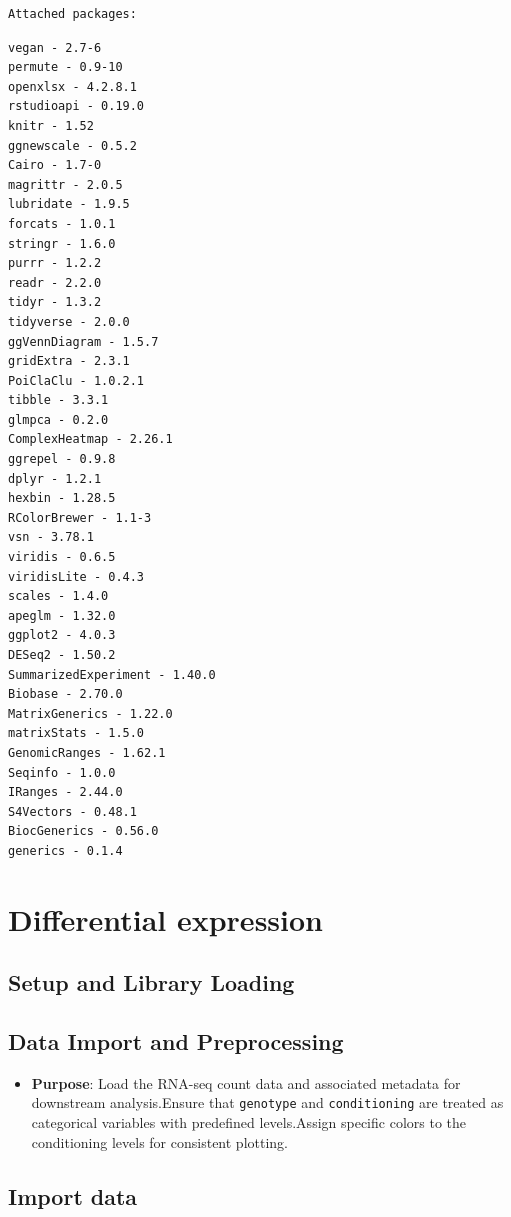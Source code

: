 \documentclass[
  11pt,
]{article}
\providecommand{\tightlist}{%
  \setlength{\itemsep}{0pt}\setlength{\parskip}{0pt}}\usepackage{longtable,booktabs,array}
\begin{document}
\begin{verbatim}
Attached packages:
\end{verbatim}

\begin{verbatim}
vegan - 2.7-6 
permute - 0.9-10 
openxlsx - 4.2.8.1 
rstudioapi - 0.19.0 
knitr - 1.52 
ggnewscale - 0.5.2 
Cairo - 1.7-0 
magrittr - 2.0.5 
lubridate - 1.9.5 
forcats - 1.0.1 
stringr - 1.6.0 
purrr - 1.2.2 
readr - 2.2.0 
tidyr - 1.3.2 
tidyverse - 2.0.0 
ggVennDiagram - 1.5.7 
gridExtra - 2.3.1 
PoiClaClu - 1.0.2.1 
tibble - 3.3.1 
glmpca - 0.2.0 
ComplexHeatmap - 2.26.1 
ggrepel - 0.9.8 
dplyr - 1.2.1 
hexbin - 1.28.5 
RColorBrewer - 1.1-3 
vsn - 3.78.1 
viridis - 0.6.5 
viridisLite - 0.4.3 
scales - 1.4.0 
apeglm - 1.32.0 
ggplot2 - 4.0.3 
DESeq2 - 1.50.2 
SummarizedExperiment - 1.40.0 
Biobase - 2.70.0 
MatrixGenerics - 1.22.0 
matrixStats - 1.5.0 
GenomicRanges - 1.62.1 
Seqinfo - 1.0.0 
IRanges - 2.44.0 
S4Vectors - 0.48.1 
BiocGenerics - 0.56.0 
generics - 0.1.4 
\end{verbatim}

\section{Differential expression}\label{differential-expression}

\subsection{Setup and Library Loading}\label{setup-and-library-loading}

\subsection{Data Import and
Preprocessing}\label{data-import-and-preprocessing}

\begin{itemize}
\tightlist
\item
  \textbf{Purpose}: Load the RNA-seq count data and associated metadata
  for downstream analysis.Ensure that \texttt{genotype} and
  \texttt{conditioning} are treated as categorical variables with
  predefined levels.Assign specific colors to the conditioning levels
  for consistent plotting.
\end{itemize}

\subsection{Import data}\label{import-data}
\end{document}
